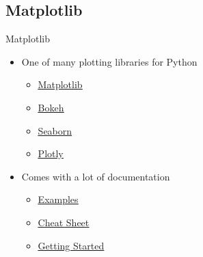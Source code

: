 \subsection{Matplotlib}
% 
% 
% 
\begin{Slide}{Matplotlib}
  \begin{itemize}

  \item One of many plotting libraries for Python
      \begin{itemize}        
      \item \underline{\href{https://matplotlib.org/}{Matplotlib}}
      \item \underline{\href{https://bokeh.org/}{Bokeh}} 
      \item \underline{\href{https://seaborn.pydata.org/}{Seaborn}}
      \item \underline{\href{https://plotly.com/}{Plotly}} 
  \end{itemize}
  
\item Comes with a lot of documentation
  \begin{itemize}
  \item \underline{\href{https://matplotlib.org/stable/plot_types/index.html}{Examples}} 
  \item \underline{\href{https://matplotlib.org/cheatsheets/}{Cheat Sheet}} 
  \item \underline{\href{https://matplotlib.org/stable/users/getting_started/}{Getting Started}} 
  \end{itemize}

    
  \end{itemize}
\end{Slide}

